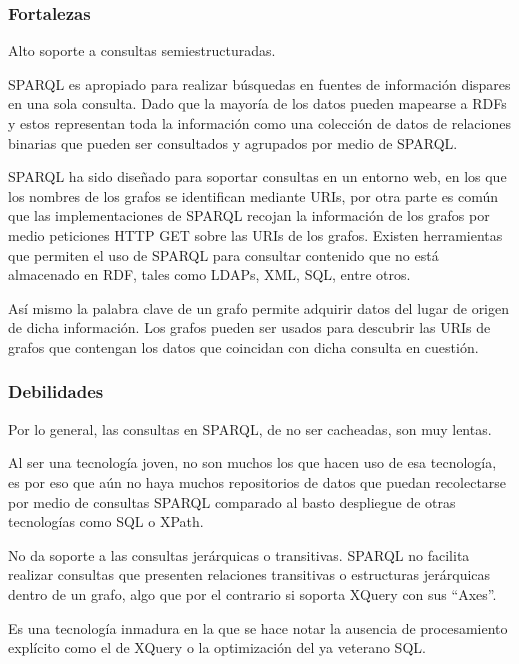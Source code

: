\subsubsection{Fortalezas}

Alto soporte a consultas semiestructuradas.

SPARQL es apropiado para realizar búsquedas en fuentes de información dispares en una sola consulta. Dado que la mayoría de los datos pueden mapearse a RDFs y estos representan toda la información como una colección de datos de relaciones binarias que pueden ser consultados y agrupados por medio de SPARQL.

SPARQL ha sido diseñado para soportar consultas en un entorno web, en los que los nombres de los grafos se identifican mediante URIs, por otra parte es común que las implementaciones de SPARQL recojan la información de los grafos por medio peticiones HTTP GET sobre las URIs de los grafos.
Existen herramientas que permiten el uso de SPARQL para consultar contenido que no está almacenado en RDF, tales como LDAPs, XML, SQL, entre otros.

Así mismo la palabra clave de un grafo permite adquirir datos del lugar de origen de dicha información. Los grafos pueden ser usados para descubrir las URIs de grafos que contengan los datos que coincidan con dicha consulta en cuestión.

\subsubsection{Debilidades}

Por lo general, las consultas en SPARQL, de no ser cacheadas, son muy lentas.

Al ser una tecnología joven, no son muchos los que hacen uso de esa tecnología, es por eso que aún no haya muchos repositorios de datos que puedan recolectarse por medio de consultas SPARQL comparado al basto despliegue de otras tecnologías como SQL o XPath\cite{XPath}.

No da soporte a las consultas jerárquicas o transitivas. SPARQL no facilita realizar consultas que presenten relaciones transitivas o estructuras jerárquicas dentro de un grafo, algo que por el contrario si soporta XQuery con sus ``Axes''.

Es una tecnología inmadura en la que se hace notar la ausencia de procesamiento explícito como el de XQuery o la optimización del ya veterano SQL.
